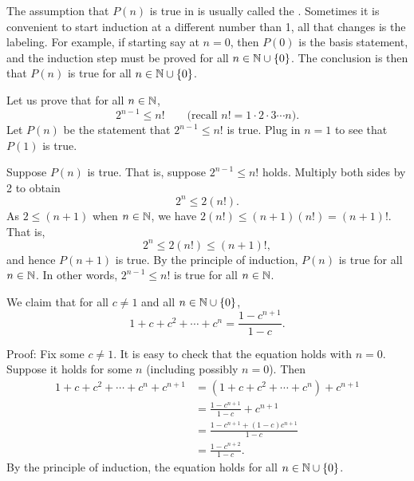 The assumption that
$P(n)$ is true in 
is usually called the \emph{}.
Sometimes it is convenient to start induction
at a different number than 1,
all that changes is the labeling.
For example,
if starting say at $n=0$, then $P(0)$ is the basis statement,
and the induction step must be proved for all
$n \in {\mathbb{N}} \cup \{ 0 \}$.
The conclusion is then that $P(n)$ is true for all
$n \in {\mathbb{N}} \cup \{ 0 \}$.

\begin{example}
Let us prove that for all $n \in {\mathbb{N}}$,
\begin{equation*}
2^{n-1} \leq n! \qquad \text{(recall } n! = 1 \cdot 2 \cdot 3 \cdots n\text{)}.
\end{equation*}
Let $P(n)$ be the statement that
$2^{n-1} \leq n!$ is true.
Plug in $n=1$ to see that $P(1)$ is true.

Suppose $P(n)$ is true.  That is, suppose 
$2^{n-1} \leq n!$ holds.  Multiply both sides by 2 to obtain
\begin{equation*}
2^n \leq 2(n!) .
\end{equation*}
As $2 \leq (n+1)$ when $n \in {\mathbb{N}}$, we have
$2(n!) \leq (n+1)(n!) = (n+1)!$.  That is,
\begin{equation*}
2^n \leq 2(n!) \leq  (n+1)!,
\end{equation*}
and hence $P(n+1)$ is true.  By the principle of induction,
$P(n)$
is true for all $n \in {\mathbb{N}}$.  In other words,
$2^{n-1} \leq n!$ is true for all $n \in {\mathbb{N}}$.
\end{example}

\begin{example} \label{example:geometricsum}
We claim that for all $c \neq 1$
and all $n \in {\mathbb{N}} \cup \{ 0 \}$,
\begin{equation*}
1 + c + c^2 + \cdots + c^n = \frac{1-c^{n+1}}{1-c} .
\end{equation*}

Proof: Fix some $c \neq 1$.
It is easy to check that the equation holds with $n=0$.
Suppose it holds for some $n$ (including possibly $n=0$).
Then
\begin{equation*}
\begin{split}
1 + c + c^2 + \cdots + c^n + c^{n+1} & =
( 1 + c + c^2 + \cdots + c^n ) + c^{n+1} \\
& = \frac{1-c^{n+1}}{1-c}  + c^{n+1} \\
& = \frac{1-c^{n+1}  + (1-c)c^{n+1}}{1-c} \\
& = \frac{1-c^{n+2}}{1-c} .
\end{split}
\end{equation*}
By the principle of induction, the equation holds for all
$n \in {\mathbb{N}} \cup \{ 0 \}$.
\end{example}


